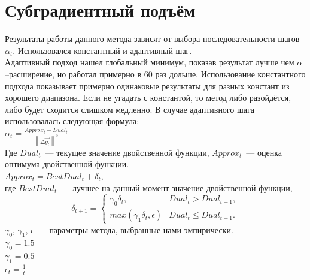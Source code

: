 \documentclass{article}
\begin{document}
\section{Субградиентный подъём}
Результаты работы данного метода зависят от выбора
последовательности шагов $\alpha_t$.
Использовался константный и адаптивный шаг.\\
Адаптивный подход нашел глобальный минимум,
показав результат лучше чем $\alpha$--расширение,
но работал примерно в $60$ раз дольше.
Использование константного подхода показывает
примерно одинаковые результаты для разных констант
из хорошего диапазона. Если не угадать с константой,
то метод либо разойдётся, либо будет сходится слишком медленно.
В случае адаптивного шага использовалась следующая формула:\\
$\alpha_t = \frac{Approx_t - Dual_t}{\left \| \Delta \overrightarrow{g_t} \right \|^2}$\\
Где $Dual_t$~--- текущее значение двойственной функции, 
$Approx_t$~--- оценка оптимума двойственной функции.\\
$Approx_t = BestDual_t + \delta_t$,\\
где $BestDual_t$~--- лучшее на данный момент значение двойственной функции,\\
\begin{equation}
    \delta_{t+1} = \begin{cases}
    \gamma_0 \delta_t, & Dual_t > Dual_{t-1},\\
    max(\gamma_1 \delta_t, \epsilon) & Dual_t \leqslant  Dual_{t-1}.
    \end{cases}
\end{equation}
$\gamma_0$, $\gamma_1$, $\epsilon$~--- параметры метода, выбранные нами эмпирически.\\
$\gamma_0 = 1.5$\\
$\gamma_1 = 0.5$\\
$\epsilon_t = \frac{1}{t}$\\
\end{document}

